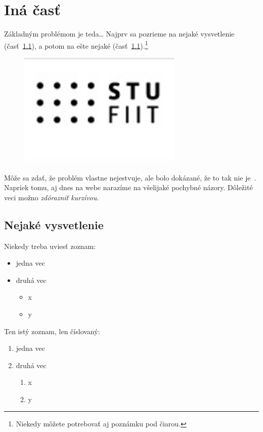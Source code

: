 \documentclass[10pt,twocolumn,slovak,a4paper]{article}
\begin{document}
\section{Iná časť} \label{ina}

Základným problémom je teda\ldots{} Najprv sa pozrieme na nejaké vysvetlenie (časť~\ref{ina:nejake}), a potom na ešte nejaké (časť~\ref{ina:nejake}).\footnote{Niekedy môžete potrebovať aj poznámku pod čiarou.}
\begin{figure}
\centering
\includegraphics{fiit_nahlad.jpg}
\end{figure}
Môže sa zdať, že problém vlastne nejestvuje\cite{Coplien:MPD}, ale bolo dokázané, že to tak nie je~\cite{Czarnecki:Staged, Czarnecki:Progress}. Napriek tomu, aj dnes na webe narazíme na všelijaké pochybné názory\cite{PLP-Framework}. Dôležité veci možno \emph{zdôrazniť kurzívou}.


\subsection{Nejaké vysvetlenie} \label{ina:nejake}

Niekedy treba uviesť zoznam:

\begin{itemize}
\item jedna vec
\item druhá vec
	\begin{itemize}
	\item x
	\item y
	\end{itemize}
\end{itemize}

Ten istý zoznam, len číslovaný:

\begin{enumerate}
\item jedna vec
\item druhá vec
	\begin{enumerate}
	\item x
	\item y
	\end{enumerate}
\end{enumerate}
\end{document}
